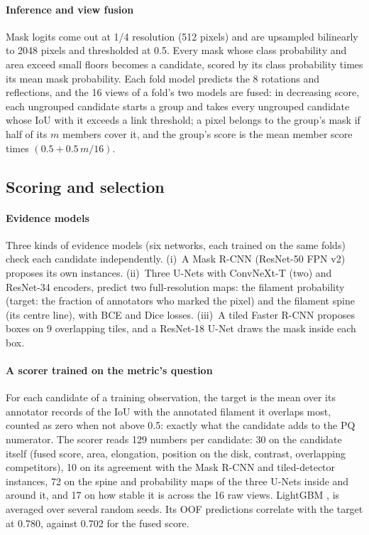\documentclass[sigconf]{acmart}
\begin{document}
\paragraph{\textbf{Inference and view fusion}} Mask logits come out at 1/4 resolution (512 pixels) and are upsampled bilinearly to 2048 pixels and thresholded at 0.5. Every mask whose class probability and area exceed small floors becomes a candidate, scored by its class probability times its mean mask probability. Each fold model predicts the 8 rotations and reflections, and the 16 views of a fold's two models are fused: in decreasing score, each ungrouped candidate starts a group and takes every ungrouped candidate whose IoU with it exceeds a link threshold; a pixel belongs to the group's mask if half of its $m$ members cover it, and the group's score is the mean member score times $(0.5 + 0.5\,m/16)$.

\subsection{Scoring and selection}\label{sec:selection}
\paragraph{\textbf{Evidence models}} Three kinds of evidence models (six networks, each trained on the same folds) check each candidate independently.
(i)~A Mask R-CNN \cite{he2017maskrcnn} (ResNet-50 FPN v2) proposes its own instances. 
(ii)~Three U-Nets \cite{ronneberger2015unet} with ConvNeXt-T \cite{liu2022convnext} (two) and ResNet-34 \cite{he2016resnet} encoders, predict two full-resolution maps: the filament probability (target: the fraction of annotators who marked the pixel) and the filament spine (its centre line), with BCE and Dice losses. 
(iii)~A tiled Faster R-CNN \cite{ren2015faster} proposes boxes on 9 overlapping tiles, and a ResNet-18 U-Net draws the mask inside each box.

\paragraph{\textbf{A scorer trained on the metric's question}} For each candidate of a training observation, the target is the mean over its annotator records of the IoU with the annotated filament it overlaps most, counted as zero when not above 0.5: exactly what the candidate adds to the PQ numerator. The scorer reads 129 numbers per candidate: 30 on the candidate itself (fused score, area, elongation, position on the disk, contrast, overlapping competitors), 10 on its agreement with the Mask R-CNN and tiled-detector instances, 72 on the spine and probability maps of the three U-Nets inside and around it, and 17 on how stable it is across the 16 raw views. LightGBM \cite{ke2017lightgbm}, is averaged over several random seeds. Its OOF predictions correlate with the target at 0.780, against 0.702 for the fused score.
\end{document}

